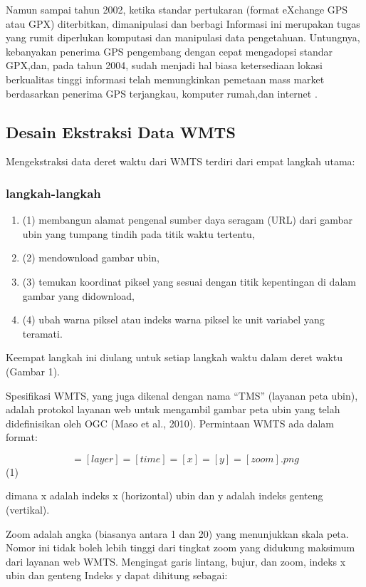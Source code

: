 Namun sampai tahun 2002, ketika standar pertukaran (format eXchange GPS atau GPX) diterbitkan, dimanipulasi dan berbagi Informasi ini
merupakan tugas yang rumit diperlukan komputasi dan manipulasi data pengetahuan. Untungnya, kebanyakan penerima GPS pengembang dengan
cepat mengadopsi standar GPX,dan, pada tahun 2004, sudah menjadi hal biasa ketersediaan lokasi berkualitas tinggi informasi telah
memungkinkan pemetaan mass market berdasarkan penerima GPS terjangkau, komputer rumah,dan internet \cite{haklay2008openstreetmap}. 


\subsection{Desain Ekstraksi Data WMTS}
Mengekstraksi data deret waktu dari WMTS terdiri dari empat langkah utama:
\subsubsection{langkah-langkah}
\begin{enumerate}
	\item (1) membangun alamat pengenal sumber daya seragam (URL) dari gambar ubin yang tumpang tindih pada titik waktu tertentu, 
	\item (2) mendownload gambar ubin, 
	\item (3) temukan koordinat piksel yang sesuai dengan titik kepentingan di dalam gambar yang didownload,
	\item (4) ubah warna piksel atau indeks warna piksel ke unit variabel yang teramati.
\end{enumerate}
Keempat langkah ini diulang untuk setiap langkah waktu dalam deret waktu (Gambar 1).

Spesifikasi WMTS, yang juga dikenal dengan nama ``TMS'' (layanan peta ubin), adalah protokol layanan web untuk mengambil gambar peta ubin yang telah
didefinisikan oleh OGC (Maso et al., 2010). Permintaan WMTS ada dalam format:

\begin{equation}
	    [server]=[layer]=[time]=[x]=[y]=[zoom].png 
\end{equation}
(1)

dimana x adalah indeks x (horizontal) ubin dan y adalah indeks genteng (vertikal).

Zoom adalah angka (biasanya antara 1 dan 20) yang menunjukkan skala peta. Nomor ini tidak boleh lebih tinggi dari tingkat zoom yang 
didukung maksimum dari layanan web WMTS. Mengingat garis lintang, bujur, dan zoom, indeks x ubin dan genteng
Indeks y dapat dihitung sebagai:

